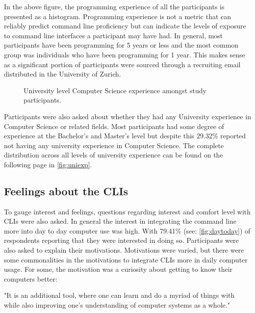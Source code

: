 In the above figure, the programming experience of all the participants is
presented as a histogram. Programming experience is not a metric that can
reliably predict command line proficiency but can indicate the levels of
exposure to command line interfaces a participant may have had. In general,
most participants have been programming for 5 years or less and the most common
group was individuals who have been programming for 1 year. This makes sense as
a significant portion of participants were sourced through a recruiting email
distributed in the University of Zurich.

\begin{figure}[h]
	\centering
	\scalebox{0.8}{}
	\caption{University level Computer Science experience amongst study participants.}
	\label{fig:uniexp}
\end{figure}

Participants were also asked about whether they had any University experience
in Computer Science or related fields. Most participants had some degree of
experience at the Bachelor's and Master's level but despite this 29.32\%
reported not having any university experience in Computer Science. The complete
distribution across all levels of university experience can be found on the following page in
\autoref{fig:uniexp}.

\FloatBarrier %


\subsection{Feelings about the CLIs}

To gauge interest and feelings, questions regarding interest and comfort level
with CLIs were also asked. In general the interest in integrating the command
line more into day to day computer use was high. With 79.41\% (see:
\autoref{fig:daytoday}) of respondents reporting that they were interested in
doing so. Participants were also asked to explain their motivations.
Motivations were varied, but there were some commonalities in the motivations
to integrate CLIs more in daily computer usage. For some, the motivation was a
curiosity about getting to know their computers better:

\begin{quotes}
	"It is an additional tool, where one can learn and do a myriad of things with while also
	improving one's understanding of computer systems as a whole."
\end{quotes}


